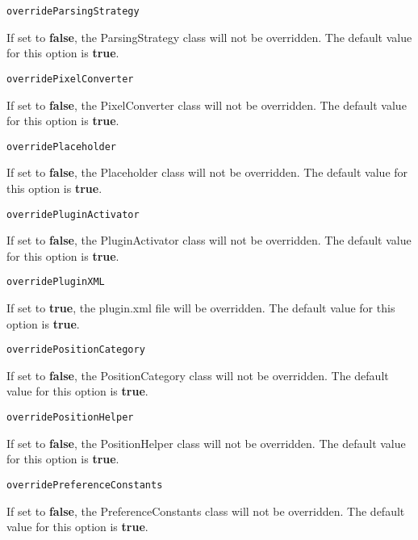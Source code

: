 \noindent\texttt{overrideParsingStrategy}
\begin{myindentpar}{1cm}
If set to \textbf{false}, the ParsingStrategy class will not be overridden. The default value for this option is \textbf{true}.
\end{myindentpar}

\noindent\texttt{overridePixelConverter}
\begin{myindentpar}{1cm}
If set to \textbf{false}, the PixelConverter class will not be overridden. The default value for this option is \textbf{true}.
\end{myindentpar}

\noindent\texttt{overridePlaceholder}
\begin{myindentpar}{1cm}
If set to \textbf{false}, the Placeholder class will not be overridden. The default value for this option is \textbf{true}.
\end{myindentpar}

\noindent\texttt{overridePluginActivator}
\begin{myindentpar}{1cm}
If set to \textbf{false}, the PluginActivator class will not be overridden. The default value for this option is \textbf{true}.
\end{myindentpar}

\noindent\texttt{overridePluginXML}
\begin{myindentpar}{1cm}
If set to \textbf{true}, the plugin.xml file will be overridden. The default value for this option is \textbf{true}.
\end{myindentpar}

\noindent\texttt{overridePositionCategory}
\begin{myindentpar}{1cm}
If set to \textbf{false}, the PositionCategory class will not be overridden. The default value for this option is \textbf{true}.
\end{myindentpar}

\noindent\texttt{overridePositionHelper}
\begin{myindentpar}{1cm}
If set to \textbf{false}, the PositionHelper class will not be overridden. The default value for this option is \textbf{true}.
\end{myindentpar}

\noindent\texttt{overridePreferenceConstants}
\begin{myindentpar}{1cm}
If set to \textbf{false}, the PreferenceConstants class will not be overridden. The default value for this option is \textbf{true}.
\end{myindentpar}

